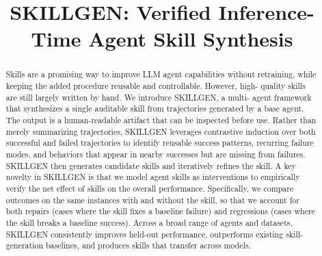 \title{SKILLGEN: Verified Inference-Time Agent Skill Synthesis}

\maketitle

\begin{abstract}
Skills are a promising way to improve LLM agent capabilities without retraining, while keeping the added procedure reusable and controllable. However, high- quality skills are still largely written by hand. We introduce SKILLGEN, a multi- agent framework that synthesizes a single auditable skill from trajectories generated by a base agent. The output is a human-readable artifact that can be inspected before use. Rather than merely summarizing trajectories, SKILLGEN leverages contrastive induction over both successful and failed trajectories to identify reusable success patterns, recurring failure modes, and behaviors that appear in nearby successes but are missing from failures. SKILLGEN then generates candidate skills and iteratively refines the skill. A key novelty in SKILLGEN is that we model agent skills as interventions to empirically verify the net effect of skills on the overall performance. Specifically, we compare outcomes on the same instances with and without the skill, so that we account for both repairs (cases where the skill fixes a baseline failure) and regressions (cases where the skill breaks a baseline success). Across a broad range of agents and datasets, SKILLGEN consistently improves held-out performance, outperforms existing skill-generation baselines, and produces skills that transfer across models.
\end{abstract}

